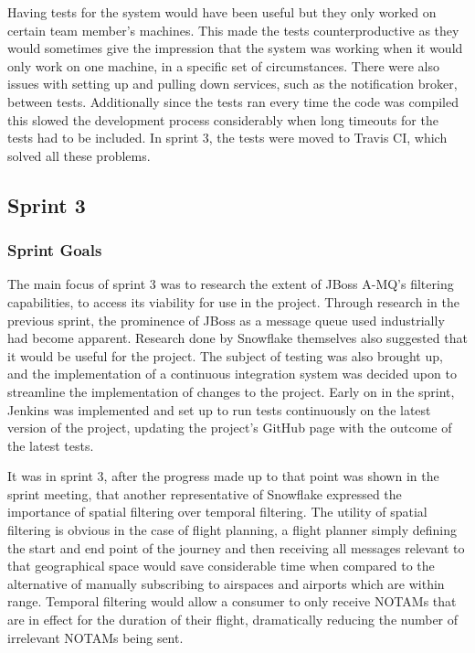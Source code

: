 \documentclass[a4paper, 12pt, twoside]{article}
\begin{document}
Having tests for the system would have been useful but they only worked on certain team member's machines. This made the tests counterproductive as they would sometimes give the impression that the system was working when it would only work on one machine, in a specific set of circumstances. There were also issues with setting up and pulling down services, such as the notification broker, between tests. Additionally since the tests ran every time the code was compiled this slowed the development process considerably when long timeouts for the tests had to be included. In sprint 3, the tests were moved to Travis CI, which solved all these problems.

\subsection{Sprint 3}
\label{sec:impl_sprint_3}

\subsubsection{Sprint Goals}

The main focus of sprint 3 was to research the extent of JBoss A-MQ's filtering capabilities, to access its viability for use in the project. Through research in the previous sprint, the prominence of JBoss as a message queue used industrially had become apparent. Research done by Snowflake themselves also suggested that it would be useful for the project. The subject of testing was also brought up, and the implementation of a continuous integration system was decided upon to streamline the implementation of changes to the project. Early on in the sprint, Jenkins was implemented and set up to run tests continuously on the latest version of the project, updating the project's GitHub page with the outcome of the latest tests.

It was in sprint 3, after the progress made up to that point was shown in the sprint meeting, that another representative of Snowflake expressed the importance of spatial filtering over temporal filtering. The utility of spatial filtering is obvious in the case of flight planning, a flight planner simply defining the start and end point of the journey and then receiving all messages relevant to that geographical space would save considerable time when compared to the alternative of manually subscribing to airspaces and airports which are within range. Temporal filtering would allow a consumer to only receive NOTAMs that are in effect for the duration of their flight, dramatically reducing the number of irrelevant NOTAMs being sent.
\end{document}
